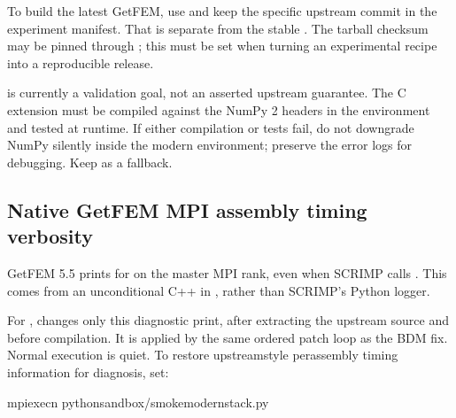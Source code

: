 \documentclass[letterpaper,10pt,english]{sphinxmanual}
\begin{document}
\sphinxAtStartPar
To build the latest  GetFEM, use
 and keep the
specific upstream commit in the experiment manifest.
That is separate from the stable . The tarball
checksum may be pinned through ; this
must be set when turning an experimental recipe into a
reproducible release.

\sphinxAtStartPar
{} is currently a validation goal, not
an asserted upstream guarantee. The C extension must be compiled
against the NumPy 2 headers in the environment and tested at
runtime. If either compilation or tests fail, do not downgrade
NumPy silently inside the modern environment; preserve the
error logs for debugging. Keep  as a fallback.


\subsection{Native GetFEM MPI assembly timing verbosity}
\label{\detokenize{install:native-getfem-mpi-assembly-timing-verbosity}}
\sphinxAtStartPar
GetFEM 5.5 prints  for 
on the master MPI rank, even when SCRIMP calls
. This comes from an unconditional
C++  in , rather than
SCRIMP’s Python logger.

\sphinxAtStartPar
For ,
 changes
only this diagnostic print, after extracting the upstream source and
before compilation. It is applied by the same ordered patch loop as
the BDM fix. Normal execution is quiet. To restore upstream\sphinxhyphen{}style
per\sphinxhyphen{}assembly timing information for diagnosis, set:

\begin{sphinxVerbatim}[commandchars=\\\{\}]
mpiexec\PYGZhy{}n
pythonsandbox/smoke\PYGZus{}modern\PYGZus{}stack.py
\end{sphinxVerbatim}
\end{document}
